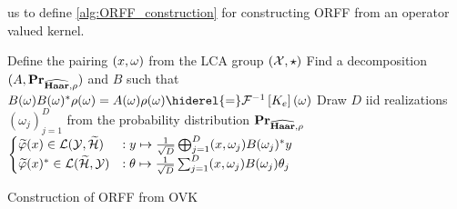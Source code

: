 \documentclass[twoside,11pt]{article}
\begin{document}
us to define \cref{alg:ORFF_construction} for constructing \acs{ORFF} from an
operator valued kernel.
\begin{center}
    \begin{algorithm2e}[t!]\label{alg:ORFF_construction}
        \SetAlgoLined
        \BlankLine
        Define the pairing $(x, \omega)$ from the \acs{LCA} group
        $(\mathcal{X}, \star)$\;
        Find a decomposition $(A,{\mathbf{{Pr}}}_{\widehat{\mathbf{Haar}},\rho})$ and $B$
        such that $B(\omega)B(\omega)^\adjoint \rho(\omega)=
        A(\omega)\rho(\omega)\hiderel{=}\IFT{K_e}(\omega)$\;
        \nl Draw $D$ \acs{iid} realizations $(\omega_j)_{j=1}^D$ from the
        probability distribution ${\mathbf{{Pr}}}_{\widehat{\mathbf{Haar}},\rho}$\;
        \nl \Return
        $\begin{cases}
            \tildePhi{\omega}(x) \in \mathcal{L}(\mathcal{Y}, \tildeH{\omega})
            &: y \mapsto \frac{1}{\sqrt{D}}\Vect_{j=1}^D\pairing{x,
            \omega_j}B(\omega_j)^\adjoint y \\
            \tildePhi{\omega}(x)^\adjoint \in\mathcal{L}(\tildeH{\omega},
            \mathcal{Y}) &: \theta \mapsto \frac{1}{\sqrt{D}} \sum_{j=1}^D
            \pairing{x, \omega_j}B(\omega_j)\theta_j
        \end{cases}$\;
        \caption{Construction of \acs{ORFF} from \acs{OVK}}
    \end{algorithm2e}
\end{center}
\end{document}
